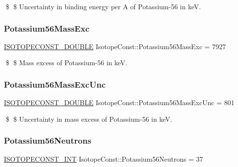 \$ \$ Uncertainty in binding energy per A of Potassium-\/56 in keV. \mbox{\label{group___isotope_const-_potassium-_k56_ga8c6c3e326f8274af503093e8233db5f6}} 
\subsubsection{\texorpdfstring{Potassium56\+Mass\+Exc}{Potassium56MassExc}}
{\footnotesize\ttfamily \mbox{\hyperlink{group___isotope_const-_macros_ga8f45a7272ce02c0b4c65c44636ed719a}{I\+S\+O\+T\+O\+P\+E\+C\+O\+N\+S\+T\+\_\+\+D\+O\+U\+B\+LE}} Isotope\+Const\+::\+Potassium56\+Mass\+Exc = 7927}

\$ \$ Mass excess of Potassium-\/56 in keV. \mbox{\label{group___isotope_const-_potassium-_k56_gaf5cf7ce2efb298d2b365457c84aa820b}} 
\subsubsection{\texorpdfstring{Potassium56\+Mass\+Exc\+Unc}{Potassium56MassExcUnc}}
{\footnotesize\ttfamily \mbox{\hyperlink{group___isotope_const-_macros_ga8f45a7272ce02c0b4c65c44636ed719a}{I\+S\+O\+T\+O\+P\+E\+C\+O\+N\+S\+T\+\_\+\+D\+O\+U\+B\+LE}} Isotope\+Const\+::\+Potassium56\+Mass\+Exc\+Unc = 801}

\$ \$ Uncertainty in mass excess of Potassium-\/56 in keV. \mbox{\label{group___isotope_const-_potassium-_k56_ga9a0841081233062e35d91b5e96158400}} 
\subsubsection{\texorpdfstring{Potassium56\+Neutrons}{Potassium56Neutrons}}
{\footnotesize\ttfamily \mbox{\hyperlink{group___isotope_const-_macros_ga5f18360b3e99483a35c32d789e62621c}{I\+S\+O\+T\+O\+P\+E\+C\+O\+N\+S\+T\+\_\+\+I\+NT}} Isotope\+Const\+::\+Potassium56\+Neutrons = 37}

